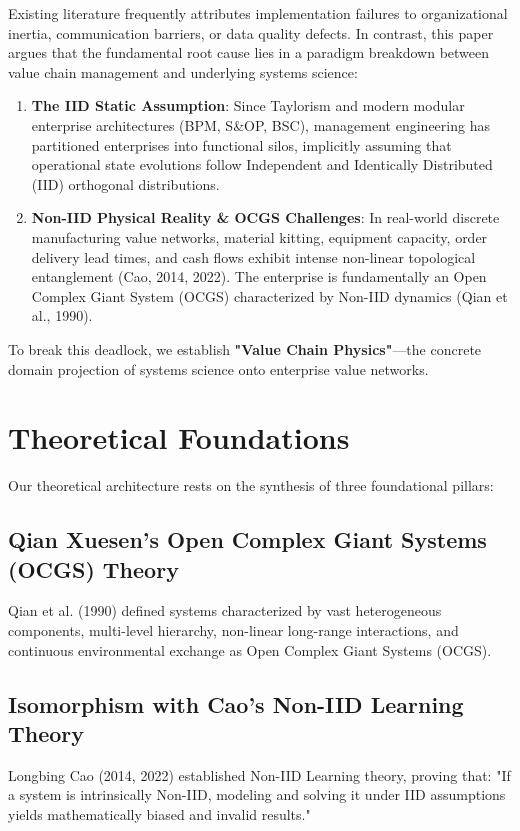 \documentclass[11pt,a4paper]{article}
\begin{document}
Existing literature frequently attributes implementation failures to organizational inertia, communication barriers, or data quality defects. In contrast, this paper argues that the fundamental root cause lies in a paradigm breakdown between value chain management and underlying systems science:
\begin{enumerate}
    \item \textbf{The IID Static Assumption}: Since Taylorism and modern modular enterprise architectures (BPM, S\&OP, BSC), management engineering has partitioned enterprises into functional silos, implicitly assuming that operational state evolutions follow Independent and Identically Distributed (IID) orthogonal distributions.
    \item \textbf{Non-IID Physical Reality \& OCGS Challenges}: In real-world discrete manufacturing value networks, material kitting, equipment capacity, order delivery lead times, and cash flows exhibit intense non-linear topological entanglement (Cao, 2014, 2022). The enterprise is fundamentally an Open Complex Giant System (OCGS) characterized by Non-IID dynamics (Qian et al., 1990).
\end{enumerate}

To break this deadlock, we establish \textbf{"Value Chain Physics"}---the concrete domain projection of systems science onto enterprise value networks.

\section{Theoretical Foundations}
Our theoretical architecture rests on the synthesis of three foundational pillars:
\subsection{Qian Xuesen's Open Complex Giant Systems (OCGS) Theory}
Qian et al. (1990) defined systems characterized by vast heterogeneous components, multi-level hierarchy, non-linear long-range interactions, and continuous environmental exchange as Open Complex Giant Systems (OCGS).

\subsection{Isomorphism with Cao's Non-IID Learning Theory}
Longbing Cao (2014, 2022) established Non-IID Learning theory, proving that: "If a system is intrinsically Non-IID, modeling and solving it under IID assumptions yields mathematically biased and invalid results."
\end{document}
